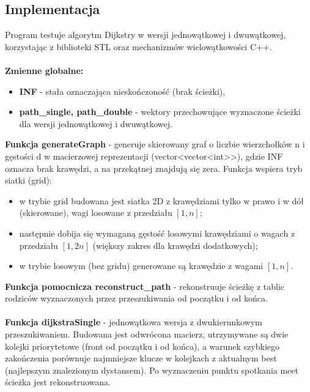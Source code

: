 \documentclass[a4paper,12pt]{article}
\begin{document}
        \subsection{Implementacja}
            \vspace{1em}
            Program testuje algorytm Dijkstry w wersji jednowątkowej i dwuwątkowej, korzystając z biblioteki STL oraz mechanizmów wielowątkowości C++.\\\\
            \textbf{Zmienne globalne:}
                \begin{itemize}
                    \item \textbf{INF} - stała oznaczająca nieskończoność (brak ścieżki),
                    \item \textbf{path\_single, path\_double} - wektory przechowujące wyznaczone ścieżki dla wersji jednowątkowej i dwuwątkowej.
                \end{itemize}
            \textbf{Funkcja generateGraph} - generuje skierowany graf o liczbie wierzchołków n i gęstości d w macierzowej reprezentacji (vector<vector<int>>), gdzie INF oznacza brak krawędzi, a na przekątnej znajdują się zera. Funkcja wspiera tryb siatki (grid):
                \begin{itemize}
                    \item w trybie grid budowana jest siatka 2D z krawędziami tylko w prawo i w dół (skierowane), wagi losowane z przedziału $[1, n]$;
                    \item następnie dobija się wymaganą gęstość losowymi krawędziami o wagach z przedziału $[1, 2n]$ (większy zakres dla krawędzi dodatkowych);
                    \item w trybie losowym (bez gridu) generowane są krawędzie z wagami $[1, n]$.
                \end{itemize}
                \textbf{Funkcja pomocnicza reconstruct\_path} - rekonstruuje ścieżkę z tablic rodziców wyznaczonych przez przeszukiwania od początku i od końca.\\
                \vspace{-0.5em}\\
                \textbf{Funkcja dijkstraSingle} - jednowątkowa wersja z dwukierunkowym przeszukiwaniem. Budowana jest odwrócona macierz, utrzymywane są dwie kolejki priorytetowe (front od początku i od końca), a warunek szybkiego zakończenia porównuje najmniejsze klucze w kolejkach z aktualnym best (najlepszym znalezionym dystansem). Po wyznaczeniu punktu spotkania meet ścieżka jest rekonstruowana.\\
\end{document}
